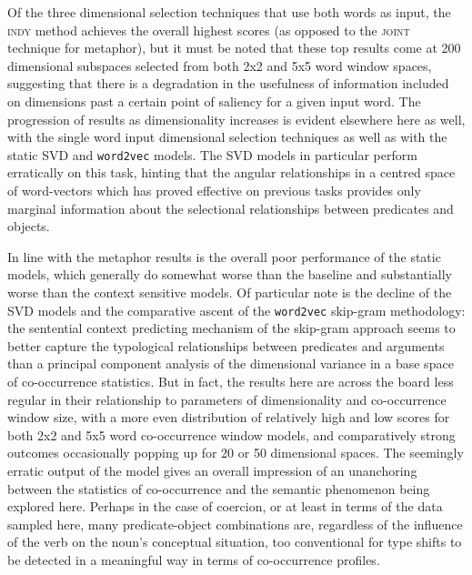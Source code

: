 Of the three dimensional selection techniques that use both words as input, the \textsc{indy} method achieves the overall highest scores (as opposed to the \textsc{joint} technique for metaphor), but it must be noted that these top results come at 200 dimensional subspaces selected from both 2x2 and 5x5 word window spaces, suggesting that there is a degradation in the usefulness of information included on dimensions past a certain point of saliency for a given input word.  The progression of results as dimensionality increases is evident elsewhere here as well, with the single word input dimensional selection techniques as well as with the static SVD and \texttt{word2vec} models.  The SVD models in particular perform erratically on this task, hinting that the angular relationships in a centred space of word-vectors which has proved effective on previous tasks provides only marginal information about the selectional relationships between predicates and objects.

In line with the metaphor results is the overall poor performance of the static models, which generally do somewhat worse than the baseline and substantially worse than the context sensitive models.  Of particular note is the decline of the \textsc{SVD} models and the comparative ascent of the \texttt{word2vec} skip-gram methodology: the sentential context predicting mechanism of the skip-gram approach seems to better capture the typological relationships between predicates and arguments than a principal component analysis of the dimensional variance in a base space of co-occurrence statistics.  But in fact, the results here are across the board less regular in their relationship to parameters of dimensionality and co-occurrence window size, with a more even distribution of relatively high and low scores for both 2x2 and 5x5 word co-occurrence window models, and comparatively strong outcomes occasionally popping up for 20 or 50 dimensional spaces.  The seemingly erratic output of the model gives an overall impression of an unanchoring between the statistics of co-occurrence and the semantic phenomenon being explored here.  Perhaps in the case of coercion, or at least in terms of the data sampled here, many predicate-object combinations are, regardless of the influence of the verb on the noun's conceptual situation, too conventional for type shifts to be detected in a meaningful way in terms of co-occurrence profiles.

